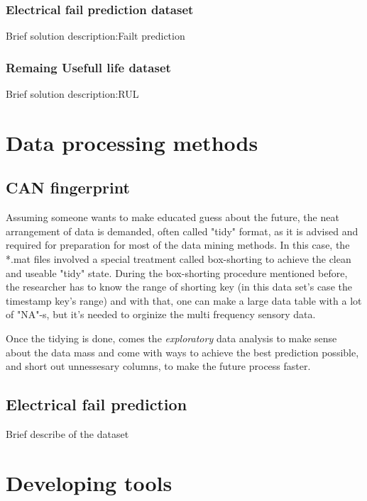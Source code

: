 			\subsubsection{Electrical fail prediction dataset}
Brief solution description:Failt prediction
			\subsubsection{Remaing Usefull life dataset}
Brief solution description:RUL
	\section{Data processing methods}
		\subsection{CAN fingerprint}
				\noindent
Assuming someone wants to make educated guess about the future, the neat arrangement of data is demanded, often called "tidy" format, as it is advised and required for preparation for most of the data mining methods.
				\noindent
In this case, the *.mat files involved a special treatment called box-shorting to achieve the clean and useable "tidy" state. During the box-shorting procedure mentioned before, the researcher has to know the range of shorting key (in this data set's case the timestamp key's range) and with that, one can make a large data table with a lot of "NA"-s, but it's needed to orginize the multi frequency sensory data.

Once the tidying is done, comes the \textit{exploratory} data analysis to make sense about the data mass and come with ways to achieve the best prediction possible, and short out unnessesary columns, to make the future process faster.
		\subsection{Electrical fail prediction}
Brief describe of the dataset
	\section{Developing tools}
